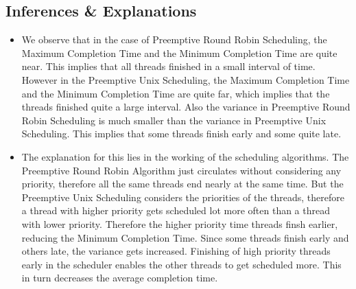 \documentclass{article}
\begin{document}
\subsection{Inferences \& Explanations}
\begin{itemize}
  \item We observe that in the case of Preemptive Round Robin Scheduling, the Maximum Completion Time and the Minimum Completion Time are quite near. This implies that all threads finished in a small interval of time. However in the Preemptive Unix Scheduling, the Maximum Completion Time and the Minimum Completion Time are quite far, which implies that the threads finished quite a large interval. Also the variance in Preemptive Round Robin Scheduling is much smaller than the variance in Preemptive Unix Scheduling. This implies that some threads finish early and some quite late.
  \item The explanation for this lies in the working of the scheduling algorithms. The Preemptive Round Robin Algorithm just circulates without considering any priority, therefore all the same threads end nearly at the same time. But the Preemptive Unix Scheduling considers the priorities of the threads, therefore a thread with higher priority gets scheduled lot more often than a thread with lower priority. Therefore the higher priority time threads finsh earlier, reducing the Minimum Completion Time.  Since some threads finish early and others late, the variance gets increased. Finishing of high priority threads early in the scheduler enables the other threads to get scheduled more. This in turn decreases the average completion time.
\end{itemize}
\end{document}

